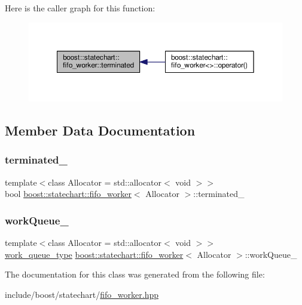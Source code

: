 Here is the caller graph for this function\+:
\nopagebreak
\begin{figure}[H]
\begin{center}
\leavevmode
\includegraphics[width=350pt]{classboost_1_1statechart_1_1fifo__worker_ac05ccf21dfcce48372f3022642e0c135_icgraph}
\end{center}
\end{figure}


\subsection{Member Data Documentation}
\mbox{\label{classboost_1_1statechart_1_1fifo__worker_a4fa42fb70ad8cf4ddc71c5792f03ba5e}} 
\subsubsection{\texorpdfstring{terminated\+\_\+}{terminated\_}}
{\footnotesize\ttfamily template$<$class Allocator = std\+::allocator$<$ void $>$$>$ \\
bool \mbox{\hyperlink{classboost_1_1statechart_1_1fifo__worker}{boost\+::statechart\+::fifo\+\_\+worker}}$<$ Allocator $>$\+::terminated\+\_\+\hspace{0.3cm}{\ttfamily [private]}}

\mbox{\label{classboost_1_1statechart_1_1fifo__worker_a26eeadc0a18615679e035b393b5dee2c}} 
\subsubsection{\texorpdfstring{work\+Queue\+\_\+}{workQueue\_}}
{\footnotesize\ttfamily template$<$class Allocator = std\+::allocator$<$ void $>$$>$ \\
\mbox{\hyperlink{classboost_1_1statechart_1_1fifo__worker_a59c84b45f3d55dfdd63e7627d0fa2e7b}{work\+\_\+queue\+\_\+type}} \mbox{\hyperlink{classboost_1_1statechart_1_1fifo__worker}{boost\+::statechart\+::fifo\+\_\+worker}}$<$ Allocator $>$\+::work\+Queue\+\_\+\hspace{0.3cm}{\ttfamily [private]}}



The documentation for this class was generated from the following file\+:\begin{DoxyCompactItemize}
\item 
include/boost/statechart/\mbox{\hyperlink{fifo__worker_8hpp}{fifo\+\_\+worker.\+hpp}}\end{DoxyCompactItemize}

